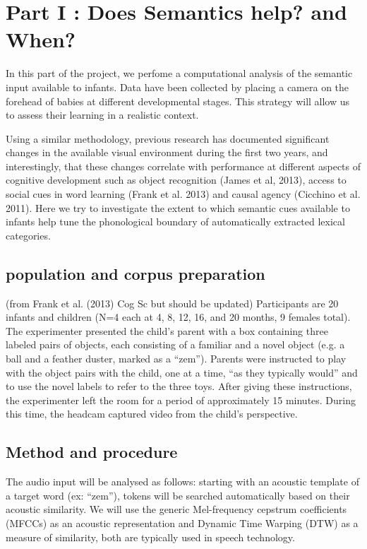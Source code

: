 \documentclass[12pt]{article}
\begin{document}
\section*{Part I : Does Semantics help? and When?}

In this part of the project, we perfome a computational analysis of the semantic input available to infants. Data have been collected by placing a camera on the forehead of babies at different developmental stages. This strategy will allow us to assess their learning in a realistic context.

Using a similar methodology, previous research has documented significant changes in the available visual environment during the first two years, and interestingly, that these changes correlate with performance at different aspects of cognitive development such as object recognition (James et al, 2013), access to social cues in word learning (Frank et al. 2013) and causal agency (Cicchino et al. 2011).
Here we try to investigate the extent to which semantic cues available to infants help tune the phonological boundary of automatically extracted lexical categories. 

\subsection*{population and corpus preparation}
(from Frank et al. (2013) Cog Sc but should be updated) Participants are 20 infants and children (N=4 each at 4, 8, 12, 16, and 20 months, 9 females total). The experimenter presented the child’s parent with a box containing three labeled pairs of objects, each consisting of a familiar and a novel object (e.g. a ball and a feather duster, marked as a “zem”). Parents were instructed to play with the object pairs with the child, one at a time, “as they typically would” and to use the novel labels to refer to the three toys. After giving these instructions, the experimenter left the room for a period of approximately 15 minutes. During this time, the headcam captured video from the child’s perspective.
\subsection*{Method and procedure}
The audio input will be analysed as follows:  starting with an acoustic template of a target word (ex: “zem”), tokens will be searched automatically based on their acoustic similarity. We will use the generic Mel-frequency cepstrum coefficients (MFCCs) as an acoustic representation and Dynamic Time Warping (DTW) as a measure of similarity, both are typically used in speech technology. 
\end{document}
